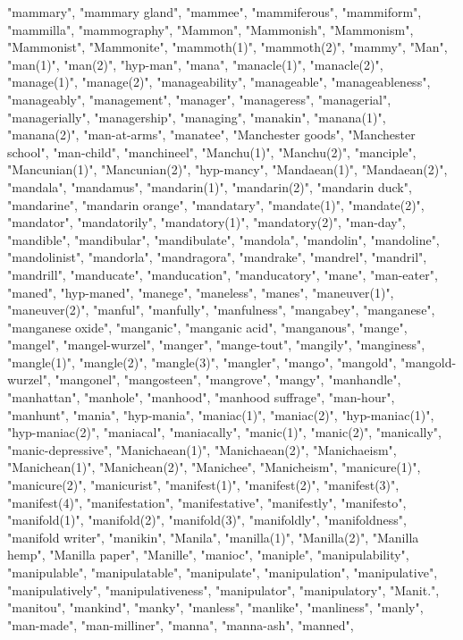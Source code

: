 "mammary",
"mammary gland",
"mammee",
"mammiferous",
"mammiform",
"mammilla",
"mammography",
"Mammon",
"Mammonish",
"Mammonism",
"Mammonist",
"Mammonite",
"mammoth(1)",
"mammoth(2)",
"mammy",
"Man",
"man(1)",
"man(2)",
"hyp-man",
"mana",
"manacle(1)",
"manacle(2)",
"manage(1)",
"manage(2)",
"manageability",
"manageable",
"manageableness",
"manageably",
"management",
"manager",
"manageress",
"managerial",
"managerially",
"managership",
"managing",
"manakin",
"manana(1)",
"manana(2)",
"man-at-arms",
"manatee",
"Manchester goods",
"Manchester school",
"man-child",
"manchineel",
"Manchu(1)",
"Manchu(2)",
"manciple",
"Mancunian(1)",
"Mancunian(2)",
"hyp-mancy",
"Mandaean(1)",
"Mandaean(2)",
"mandala",
"mandamus",
"mandarin(1)",
"mandarin(2)",
"mandarin duck",
"mandarine",
"mandarin orange",
"mandatary",
"mandate(1)",
"mandate(2)",
"mandator",
"mandatorily",
"mandatory(1)",
"mandatory(2)",
"man-day",
"mandible",
"mandibular",
"mandibulate",
"mandola",
"mandolin",
"mandoline",
"mandolinist",
"mandorla",
"mandragora",
"mandrake",
"mandrel",
"mandril",
"mandrill",
"manducate",
"manducation",
"manducatory",
"mane",
"man-eater",
"maned",
"hyp-maned",
"manege",
"maneless",
"manes",
"maneuver(1)",
"maneuver(2)",
"manful",
"manfully",
"manfulness",
"mangabey",
"manganese",
"manganese oxide",
"manganic",
"manganic acid",
"manganous",
"mange",
"mangel",
"mangel-wurzel",
"manger",
"mange-tout",
"mangily",
"manginess",
"mangle(1)",
"mangle(2)",
"mangle(3)",
"mangler",
"mango",
"mangold",
"mangold-wurzel",
"mangonel",
"mangosteen",
"mangrove",
"mangy",
"manhandle",
"manhattan",
"manhole",
"manhood",
"manhood suffrage",
"man-hour",
"manhunt",
"mania",
"hyp-mania",
"maniac(1)",
"maniac(2)",
"hyp-maniac(1)",
"hyp-maniac(2)",
"maniacal",
"maniacally",
"manic(1)",
"manic(2)",
"manically",
"manic-depressive",
"Manichaean(1)",
"Manichaean(2)",
"Manichaeism",
"Manichean(1)",
"Manichean(2)",
"Manichee",
"Manicheism",
"manicure(1)",
"manicure(2)",
"manicurist",
"manifest(1)",
"manifest(2)",
"manifest(3)",
"manifest(4)",
"manifestation",
"manifestative",
"manifestly",
"manifesto",
"manifold(1)",
"manifold(2)",
"manifold(3)",
"manifoldly",
"manifoldness",
"manifold writer",
"manikin",
"Manila",
"manilla(1)",
"Manilla(2)",
"Manilla hemp",
"Manilla paper",
"Manille",
"manioc",
"maniple",
"manipulability",
"manipulable",
"manipulatable",
"manipulate",
"manipulation",
"manipulative",
"manipulatively",
"manipulativeness",
"manipulator",
"manipulatory",
"Manit.",
"manitou",
"mankind",
"manky",
"manless",
"manlike",
"manliness",
"manly",
"man-made",
"man-milliner",
"manna",
"manna-ash",
"manned",
